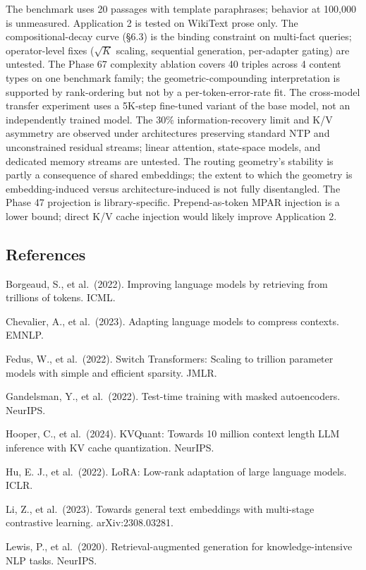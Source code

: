 The benchmark uses 20 passages with template paraphrases; behavior at 100,000 is unmeasured. Application 2 is tested on WikiText prose only. The compositional-decay curve (§6.3) is the binding constraint on multi-fact queries; operator-level fixes (\(\sqrt{K}\) scaling, sequential generation, per-adapter gating) are untested. The Phase 67 complexity ablation covers 40 triples across 4 content types on one benchmark family; the geometric-compounding interpretation is supported by rank-ordering but not by a per-token-error-rate fit. The cross-model transfer experiment uses a 5K-step fine-tuned variant of the base model, not an independently trained model. The 30\% information-recovery limit and K/V asymmetry are observed under architectures preserving standard NTP and unconstrained residual streams; linear attention, state-space models, and dedicated memory streams are untested. The routing geometry's stability is partly a consequence of shared embeddings; the extent to which the geometry is embedding-induced versus architecture-induced is not fully disentangled. The Phase 47 projection is library-specific. Prepend-as-token MPAR injection is a lower bound; direct K/V cache injection would likely improve Application 2.

\subsection{References}\label{references}

Borgeaud, S., et al.~(2022). Improving language models by retrieving from trillions of tokens. ICML.

Chevalier, A., et al.~(2023). Adapting language models to compress contexts. EMNLP.

Fedus, W., et al.~(2022). Switch Transformers: Scaling to trillion parameter models with simple and efficient sparsity. JMLR.

Gandelsman, Y., et al.~(2022). Test-time training with masked autoencoders. NeurIPS.

Hooper, C., et al.~(2024). KVQuant: Towards 10 million context length LLM inference with KV cache quantization. NeurIPS.

Hu, E. J., et al.~(2022). LoRA: Low-rank adaptation of large language models. ICLR.

Li, Z., et al.~(2023). Towards general text embeddings with multi-stage contrastive learning. arXiv:2308.03281.

Lewis, P., et al.~(2020). Retrieval-augmented generation for knowledge-intensive NLP tasks. NeurIPS.

